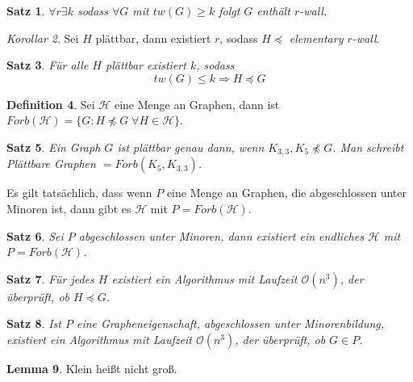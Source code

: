 \documentclass[a4paper, 12pt]{article}
\theoremstyle{plain}
\newtheorem{theorem}{Satz}[subsection] %
\theoremstyle{definition}
\newtheorem{definition}[theorem]{Definition} %
\theoremstyle{lemma}
\newtheorem{lemma}[theorem]{Lemma}
\theoremstyle{remark}
\theoremstyle{corollary}
\newtheorem{corollary}[theorem]{Korollar}
\theoremstyle{example}
\begin{document}
	\begin{theorem}
		$\forall r \exists k$ sodass $\forall G$ mit $tw(G) \geq k$ folgt $G$ enthält $r$-wall.
	\end{theorem}
	\begin{corollary}
		Sei $H$ plättbar, dann existiert $r$, sodass $H\preceq$ \textit{elementary $r$-wall}.
	\end{corollary}
	\begin{theorem}
		Für alle $H$ plättbar existiert $k$, sodass \[tw(G) \leq k \Rightarrow H \preceq G\]
	\end{theorem}
	\begin{definition}
		Sei $\mathcal{H}$ eine Menge an Graphen, dann ist $Forb(\mathcal{H}) = \{G: H\not\preceq G \; \forall H \in \mathcal{H}\}$.
	\end{definition}
	\begin{theorem}
		Ein Graph $G$ ist plättbar genau dann, wenn $K_{3,3},K_5 \not \preceq G$. Man schreibt Plättbare Graphen $= Forb(K_5,K_{3,3})$.
	\end{theorem}
	Es gilt tatsächlich, dass wenn $P$ eine Menge an Graphen, die abgeschlossen unter Minoren ist, dann gibt es $\mathcal{H}$ mit $P = Forb(\mathcal{H})$.
	\begin{theorem}
		Sei $P$ abgeschlossen unter Minoren, dann existiert ein endliches $\mathcal{H}$ mit $P = Forb(\mathcal{H})$.
	\end{theorem}
	\begin{theorem}
		Für jedes $H$ existiert ein Algorithmus mit Laufzeit $\mathcal{O}(n^3)$, der überprüft, ob $H \preceq G$.
	\end{theorem}
	\begin{theorem}
		Ist $P$ eine Grapheneigenschaft, abgeschlossen unter Minorenbildung, existiert ein Algorithmus mit Laufzeit $\mathcal{O}(n^3)$, der überprüft, ob $G\in P$.
	\end{theorem}
	\begin{lemma}
		Klein heißt nicht groß.
	\end{lemma}
\end{document}
